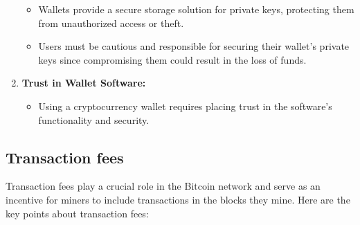 \begin{enumerate}
	\begin{itemize}
		\item Wallets provide a secure storage solution for private keys, protecting them from unauthorized access or theft.
		\item Users must be cautious and responsible for securing their wallet's private keys since compromising them could result in the loss of funds.
	\end{itemize}
	\item \textbf{Trust in Wallet Software:}
	\begin{itemize}
		\item Using a cryptocurrency wallet requires placing trust in the software's functionality and security.
	\end{itemize}
\end{enumerate}
\subsection{Transaction fees}
Transaction fees play a crucial role in the Bitcoin network and serve as an incentive for miners to include transactions in the blocks they mine. Here are the key points about transaction fees:
